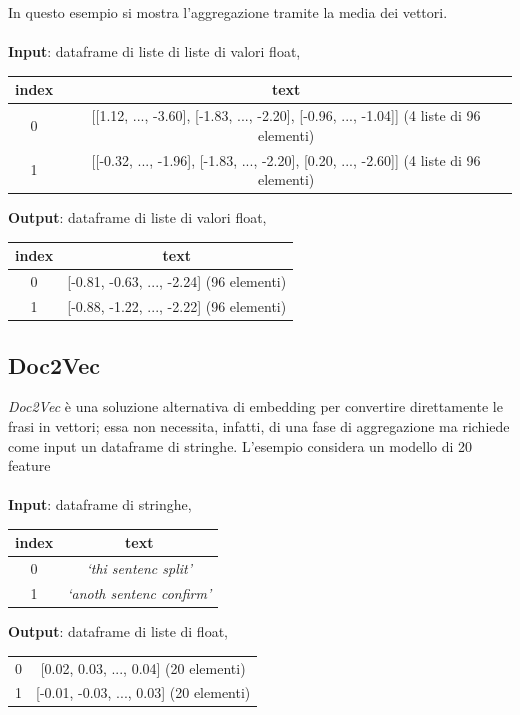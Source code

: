 \documentclass[12pt]{report}
\theoremstyle{definition}
\begin{document}
In questo esempio si mostra l'aggregazione tramite la media dei vettori.
\\
\\
\textbf{Input}: dataframe di liste di liste di valori float,
\begin{center}
    \begin{tabular}{|c|c|}
    \hline
    \textbf{index} & \textbf{text} \\
    \hline
         0 & [[1.12, ..., -3.60], [-1.83, ..., -2.20], [-0.96, ..., -1.04]] (4 liste di 96 elementi) \\
         1 & [[-0.32, ..., -1.96], [-1.83, ..., -2.20], [0.20, ..., -2.60]] (4 liste di 96 elementi) \\
    \hline
    \end{tabular}
\end{center}
\textbf{Output}: dataframe di liste di valori float,
\begin{center}
    \begin{tabular}{|c|c|}
    \hline
    \textbf{index} & \textbf{text} \\
    \hline
         0 & [-0.81, -0.63, ..., -2.24] (96 elementi) \\
         1 & [-0.88, -1.22, ..., -2.22] (96 elementi) \\
    \hline
    \end{tabular}
\end{center}

\subsection{Doc2Vec}
\textit{Doc2Vec} è una soluzione alternativa di embedding per convertire direttamente le frasi in vettori; essa non necessita, infatti, di una fase di aggregazione ma richiede come input un dataframe di stringhe.
L'esempio considera un modello di 20 feature 
\\
\\
\textbf{Input}: dataframe di stringhe,
\begin{center}
    \begin{tabular}{|c|c|}
    \hline
    \textbf{index} & \textbf{text} \\
    \hline
         0 & \textit{`thi sentenc split'}\\
         1 & \textit{`anoth sentenc confirm'}\\
    \hline
    \end{tabular}
\end{center}
\textbf{Output}: dataframe di liste di float,
\begin{center}
    \begin{tabular}{|c|c|}
    \hline
         0 & [0.02, 0.03, ..., 0.04] (20 elementi) \\
         1 & [-0.01, -0.03, ..., 0.03] (20 elementi) \\
    \hline
    \end{tabular}
\end{center}
\end{document}
